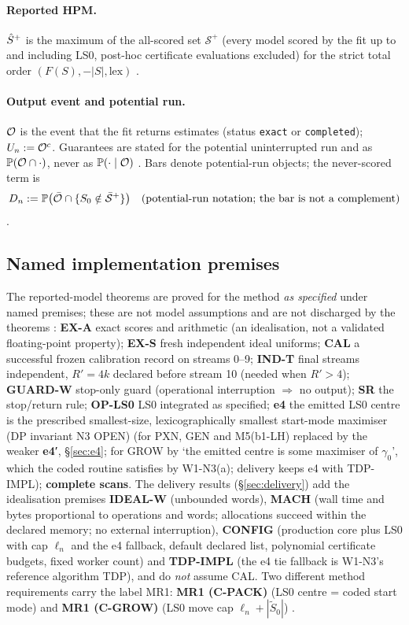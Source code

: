\paragraph{Reported HPM.} $\hat S^{+}$ is the maximum of the all-scored set $\mathcal S^{+}$ (every model scored by the fit up to and including LS0, post-hoc certificate evaluations excluded) for the strict total order $(F(S),-|S|,\text{lex})$ .

\paragraph{Output event and potential run.} $\mathcal O$ is the event that the fit returns estimates (status \texttt{exact} or \texttt{completed}); $U_n:=\mathcal O^c$. Guarantees are stated for the potential uninterrupted run and as $\mathbb P(\mathcal O\cap\cdot)$, never as $\mathbb P(\cdot\mid\mathcal O)$ . Bars denote potential-run objects; the never-scored term is
\[
D_n:=\mathbb P\bigl(\bar{\mathcal O}\cap\{S_0\notin\bar{\mathcal S}^{+}\}\bigr)\quad\text{(potential-run notation; the bar is not a complement)}
\]
.

\subsection{Named implementation premises}\label{sec:premises}
The reported-model theorems are proved for the method \emph{as specified} under named premises; these are not model assumptions and are not discharged by the theorems :
\textbf{EX-A} exact scores and arithmetic (an idealisation, not a validated floating-point property); \textbf{EX-S} fresh independent ideal uniforms; \textbf{CAL} a successful frozen calibration record on streams 0--9; \textbf{IND-T} final streams independent, $R'=4k$ declared before stream 10 (needed when $R'>4$); \textbf{GUARD-W} stop-only guard (operational interruption $\Rightarrow$ no output); \textbf{SR} the stop/return rule; \textbf{OP-LS0} LS0 integrated as specified; \textbf{e4} the emitted LS0 centre is the prescribed smallest-size, lexicographically smallest start-mode maximiser (DP invariant N3 OPEN) (for PXN, GEN and M5(b1-LH) replaced by the weaker \textbf{e4′}, §\ref{sec:e4}; for GROW by `the emitted centre is some maximiser of $\gamma_0$', which the coded routine satisfies by W1-N3(a); delivery keeps e4 with TDP-IMPL); \textbf{complete scans}. The delivery results (§\ref{sec:delivery}) add the idealisation premises \textbf{IDEAL-W} (unbounded words), \textbf{MACH} (wall time and bytes proportional to operations and words; allocations succeed within the declared memory; no external interruption), \textbf{CONFIG} (production core plus LS0 with cap $\ell_n$ and the e4 fallback, default declared list, polynomial certificate budgets, fixed worker count) and \textbf{TDP-IMPL} (the e4 tie fallback is W1-N3's reference algorithm TDP), and do \emph{not} assume CAL. Two different method requirements carry the label MR1: \textbf{MR1 (C-PACK)} (LS0 centre = coded start mode) and \textbf{MR1 (C-GROW)} (LS0 move cap $\ell_n+|\tilde{S}_0|$) .

